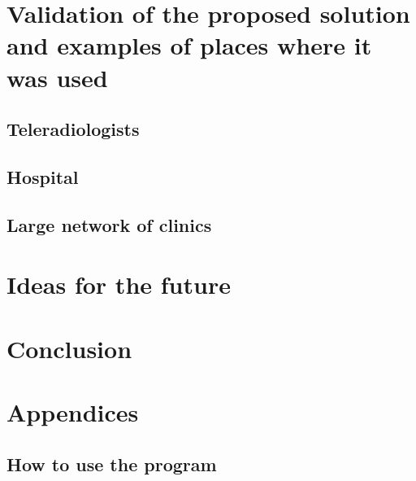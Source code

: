\documentclass[12pt, twoside, openany]{report}
\theoremstyle{definition}
\begin{document}
\chapter{Validation of the proposed solution and examples of places where it was used}
\section{Teleradiologists}
\section{Hospital}
\section{Large network of clinics}
\chapter{Ideas for the future}
\chapter{Conclusion}

\chapter {Appendices}
\section {How to use the program}


\end{document}
